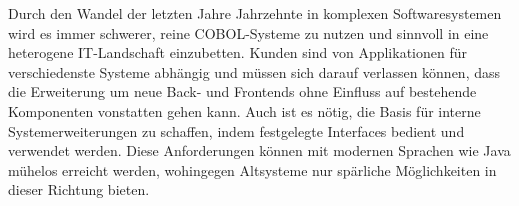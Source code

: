 Durch den Wandel der letzten Jahre \bzw Jahrzehnte in komplexen Softwaresystemen wird es immer schwerer, reine COBOL-Systeme zu nutzen und sinnvoll in eine heterogene IT-Landschaft einzubetten. Kunden sind von Applikationen für verschiedenste Systeme abhängig und müssen sich darauf verlassen können, dass die Erweiterung um neue Back- und Frontends ohne Einfluss auf bestehende Komponenten vonstatten gehen kann. Auch ist es nötig, die Basis für interne Systemerweiterungen zu schaffen, indem festgelegte Interfaces bedient und verwendet werden. Diese Anforderungen können mit modernen Sprachen wie Java mühelos erreicht werden, wohingegen Altsysteme nur spärliche Möglichkeiten in dieser Richtung bieten.